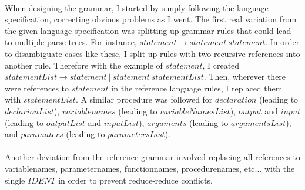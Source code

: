 \documentclass[12pt, a3paper]{article}
\begin{document}
\maketitle

\paragraph{}
When designing the grammar, I started by simply following the language specification, correcting obvious problems as I went.
The first real variation from the given language specification was splitting up grammar rules that could lead to multiple parse trees.
For instance, $statement \rightarrow statement \ statement.$ In order to disambiguate cases like these, I split up rules with two recursive references into another rule.
Therefore with the example of $statement$, I created $statementList \rightarrow statement \ | \ statement \ statementList.$ Then, wherever there were references to $statement$ in the
reference language rules, I replaced them with $statementList$. A similar procedure was followed for $declaration$ (leading to $declarionList$), $variablenames$ (leading to $variableNamesList$),  $output$ and $input$ (leading to $outputList$ and $inputList$), $arguments$ (leading to $argumentsList$), and $paramaters$ (leading to $parametersList$).

\paragraph{}
Another deviation from the reference grammar involved replacing all references to variablenames, parameternames, functionnames, procedurenames, etc... with the single $IDENT$ in order to prevent reduce-reduce conflicts.
\end{document}
